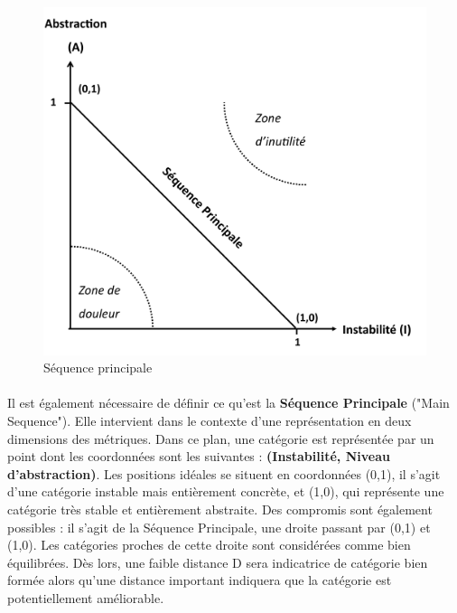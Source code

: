 \documentclass{scrartcl}
\begin{document}
\begin{figure}[h!]
    \centering
    \includegraphics[width=\textwidth/2]{img/MainSequence.png}
    \caption{Séquence principale}
\end{figure}

    \paragraph{}Il est également nécessaire de définir ce qu'est la \textbf{Séquence Principale} ("Main Sequence"). Elle intervient dans le contexte d'une représentation en deux dimensions des métriques. Dans ce plan, une catégorie est représentée par un point dont les coordonnées sont les suivantes : \textbf{(Instabilité, Niveau d'abstraction)}. Les positions idéales se situent en coordonnées (0,1), il s'agit d'une catégorie instable mais entièrement concrète, et (1,0), qui représente une catégorie très stable et entièrement abstraite. Des compromis sont également possibles : il s'agit de la Séquence Principale, une droite passant par (0,1) et (1,0). Les catégories proches de cette droite sont considérées comme bien équilibrées. Dès lors, une faible distance D sera indicatrice de catégorie bien formée alors qu'une distance important indiquera que la catégorie est potentiellement améliorable.
    
\end{document}
